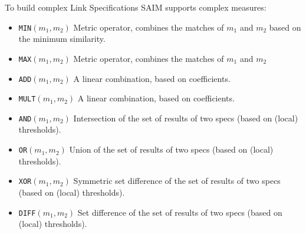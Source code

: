 \documentclass[oneside,a4paper,12pt]{memoir}
\begin{document}
 To build complex Link Specifications SAIM supports complex measures:

\begin{itemize}
	\item \texttt{MIN}$(m_1, m_2)$ Metric operator, combines the matches of $m_1$ and $m_2$ based on the minimum similarity.
	\item \texttt{MAX}$(m_1, m_2)$ Metric operator, combines the matches of $m_1$ and $m_2$ 
	\item \texttt{ADD}$(m_1, m_2)$ A linear combination, based on coefficients.
	\item \texttt{MULT}$(m_1, m_2)$ A linear combination, based on coefficients.
	\item \texttt{AND}$(m_1, m_2)$ Intersection of the set of results of two specs (based on (local) thresholds).
	\item \texttt{OR}$(m_1, m_2)$ Union of the set of results of two specs (based on (local) thresholds).
	\item \texttt{XOR}$(m_1, m_2)$ Symmetric set difference of the set of results of two specs (based on (local) thresholds).
	\item \texttt{DIFF}$(m_1, m_2)$ Set difference of the set of results of two specs (based on (local) thresholds).
\end{itemize}
\end{document}
